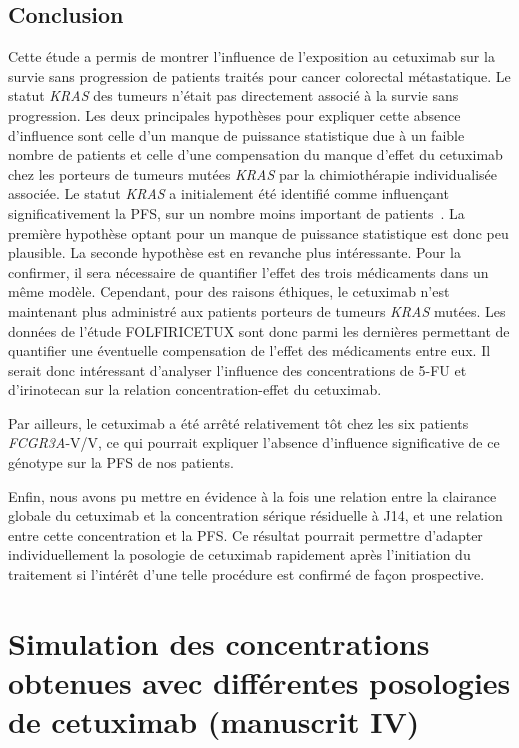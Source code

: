 \subsection{Conclusion}
Cette étude a permis de montrer l'influence de l'exposition au cetuximab sur la survie sans progression de patients traités pour cancer colorectal métastatique. Le statut \textit{KRAS} des tumeurs n'était pas directement associé à la survie sans progression. Les deux principales hypothèses pour expliquer cette absence d'influence sont celle d'un manque de puissance statistique due à un faible nombre de patients et celle d'une compensation du manque d'effet du cetuximab chez les porteurs de tumeurs mutées \textit{KRAS} par la chimiothérapie individualisée associée. Le statut \textit{KRAS} a initialement été identifié comme influençant significativement la PFS, sur un nombre moins important de patients~\citep{REF110}. La première hypothèse optant pour un manque de puissance statistique est donc peu plausible. La seconde hypothèse est en revanche plus intéressante. Pour la confirmer, il sera nécessaire de quantifier l'effet des trois médicaments dans un même modèle. Cependant, pour des raisons éthiques, le cetuximab n'est maintenant plus administré aux patients porteurs de tumeurs \textit{KRAS} mutées. Les données de l'étude FOLFIRICETUX sont donc parmi les dernières permettant de quantifier une éventuelle compensation de l'effet des médicaments entre eux. Il serait donc intéressant d'analyser l'influence des concentrations de 5-FU et d'irinotecan sur la relation concentration-effet du cetuximab.

Par ailleurs, le cetuximab a été arrêté relativement tôt chez les six patients \textit{FCGR3A}-V/V, ce qui pourrait expliquer l'absence d'influence significative de ce génotype sur la PFS de nos patients. 

Enfin, nous avons pu mettre en évidence à la fois une relation entre la clairance globale du cetuximab et la concentration sérique résiduelle à J14, et une relation entre cette concentration et la PFS. Ce résultat pourrait permettre d'adapter individuellement la posologie de cetuximab rapidement après l'initiation du traitement si l'intérêt d'une telle procédure est confirmé de façon prospective.

\section{Simulation des concentrations obtenues avec différentes posologies de cetuximab (manuscrit IV)}
